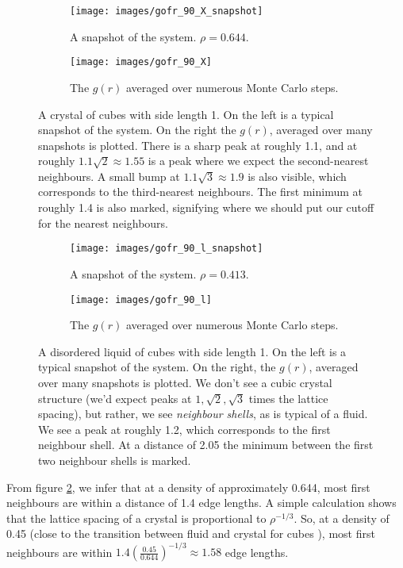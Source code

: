 \documentclass[thesis]{subfiles}
\begin{document}
\begin{figure}[H]
	\centering
	\begin{subfigure}{0.3\textwidth}
		\centering
		\texttt{[image: images/gofr\_90\_X\_snapshot]}
		\caption{A snapshot of the system. $\rho = 0.644$.}
	\end{subfigure}
	\begin{subfigure}{0.5\textwidth}
		\centering
		\texttt{[image: images/gofr\_90\_X]}
		\caption{The $g(r)$ averaged over numerous Monte Carlo steps.}
		\label{fig:gofr_crystal_b}
	\end{subfigure}
	\caption{A crystal of cubes with side length 1. On the left is a typical snapshot of the system. On the right the $g(r)$, averaged over many  snapshots is plotted. There is a sharp peak at roughly 1.1, and at roughly $1.1 \sqrt 2 \approx 1.55$ is a peak where we expect the second-nearest neighbours. A small bump at $1.1 \sqrt 3 \approx 1.9$ is also visible, which corresponds to the third-nearest neighbours. The first minimum at roughly 1.4 is also marked, signifying where we should put our cutoff for the nearest neighbours.}
\end{figure}

\begin{figure}[H]
	\centering
	\vspace{-8pt}
\begin{subfigure}{0.3\textwidth}
	\centering
	\vspace{8pt}
	\texttt{[image: images/gofr\_90\_l\_snapshot]}
	\vspace{10pt}
	\caption{A snapshot of the system. $\rho = 0.413$.} 
\end{subfigure}
\begin{subfigure}{0.5\textwidth}
	\centering
	\texttt{[image: images/gofr\_90\_l]}
	\caption{The $g(r)$ averaged over numerous Monte Carlo steps.}
\end{subfigure}
\caption{A disordered liquid of cubes with side length 1. On the left is a typical snapshot of the system. On the right, the $g(r)$, averaged over many snapshots is plotted. We don't see a cubic crystal structure (we'd expect peaks at $1, \sqrt 2, \sqrt 3$ times the lattice spacing), but rather, we see \emph{neighbour shells}, as is typical of a fluid. We see a peak at roughly 1.2, which corresponds to the first neighbour shell. At a distance of 2.05 the minimum between the first two neighbour shells is marked.}
\end{figure}
From figure \ref{fig:gofr_crystal_b}, we infer that at a density of approximately 0.644, most first neighbours are within a distance of 1.4 edge lengths. A simple calculation shows  that the lattice spacing of a crystal is proportional to $\rho^{-1/3}$. So, at a density of 0.45 (close to the transition between fluid and crystal for cubes \cite{van2017phase}), most first neighbours are within $1.4 \left( \frac{0.45}{0.644}\right)^{-1/3} \approx 1.58$ edge lengths. 
\end{document}
